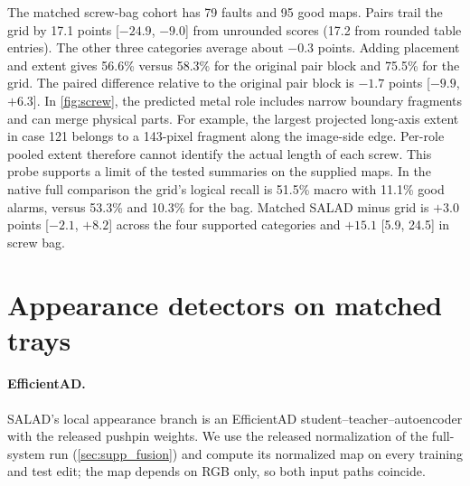 The matched screw-bag cohort has 79 faults and 95 good maps. Pairs trail the grid by 17.1 points [$-24.9$, $-9.0$] from unrounded scores (17.2 from rounded table entries). The other three categories average about $-0.3$ points. Adding placement and extent gives 56.6\% versus 58.3\% for the original pair block and 75.5\% for the grid. The paired difference relative to the original pair block is $-1.7$ points [$-9.9$, $+6.3$]. In \cref{fig:screw}, the predicted metal role includes narrow boundary fragments and can merge physical parts. For example, the largest projected long-axis extent in case 121 belongs to a 143-pixel fragment along the image-side edge. Per-role pooled extent therefore cannot identify the actual length of each screw. This probe supports a limit of the tested summaries on the supplied maps. In the native full comparison the grid's logical recall is 51.5\% macro with 11.1\% good alarms, versus 53.3\% and 10.3\% for the bag. Matched SALAD minus grid is $+3.0$ points [$-2.1$, $+8.2$] across the four supported categories and $+15.1$ [5.9, 24.5] in screw bag.
\section{Appearance detectors on matched trays}
\label{sec:supp_appearance}
\begin{table}[t]
\centering
\caption{Matched pushpin trays with the 1.6k-step continuations and the appearance detectors (re-segmented path, 138 photographs). Alarms out of 138; spread in \%; $C$ is untouched compartments queued per fault and $R$ target recall (\%) at the training-fixed threshold or list; pooled $C$ mixes relocations and vacancies; region area (\%) with faulty-tray negatives only or with source and sham compartments added. The rule needs task knowledge.}
\label{tab:matched_v2}
\small\setlength{\tabcolsep}{4.2pt}

\end{table}
\paragraph{EfficientAD.} SALAD's local appearance branch is an EfficientAD student--teacher--autoencoder \cite{batzner2024} with the released pushpin weights. We use the released normalization of the full-system run (\cref{sec:supp_fusion}) and compute its normalized map on every training and test edit; the map depends on RGB only, so both input paths coincide.
